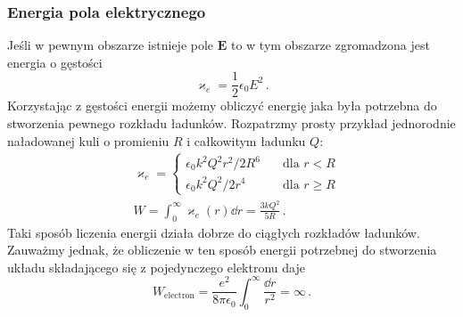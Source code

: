 \documentclass[../main.tex]{subfiles}
\begin{document}
\subsubsection{Energia pola elektrycznego}
Jeśli w pewnym obszarze istnieje pole \(\mathbf{E}\) to w tym obszarze zgromadzona jest energia o gęstości
\begin{equation*}
    \varkappa_e=\frac{1}{2}\epsilon_0E^2\,.
\end{equation*}
Korzystając z gęstości energii możemy obliczyć energię jaka była potrzebna do stworzenia pewnego rozkładu ładunków. Rozpatrzmy prosty przykład jednorodnie naładowanej kuli o promieniu \(R\) i całkowitym ładunku \(Q\):
\begin{equation*}
    \begin{split}
        &\varkappa_e=\begin{cases} \epsilon_0k^2Q^2r^2/2R^6\quad&\text{dla \(r<R\)}\\ \epsilon_0 k^2Q^2/2r^4\quad&\text{dla \(r\geq R\)}\end{cases}\\
        &W=\int_0^\infty\varkappa_e(r)\dd{r}=\frac{3kQ^2}{5R}\,.
    \end{split}
\end{equation*}
Taki sposób liczenia energii działa dobrze do ciągłych rozkładów ładunków. Zauważmy jednak, że obliczenie w ten sposób energii potrzebnej do stworzenia układu składającego się z pojedynczego elektronu daje
\begin{equation*}
    W_\text{electron}=\frac{e^2}{8\pi\epsilon_0}\int_0^\infty\frac{\dd{r}}{r^2}=\infty\,.
\end{equation*}
\end{document}
